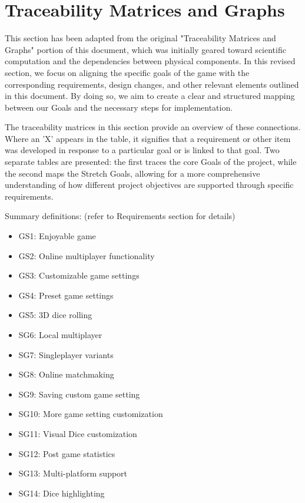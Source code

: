 \section{Traceability Matrices and Graphs}

This section has been adapted from the original "Traceability Matrices and Graphs" portion of this document, which was initially geared toward scientific computation and the dependencies between physical components. In this revised section, we focus on aligning the specific goals of the game with the corresponding requirements, design changes, and other relevant elements outlined in this document. By doing so, we aim to create a clear and structured mapping between our Goals and the necessary steps for implementation.

The traceability matrices in this section provide an overview of these connections. Where an 'X' appears in the table, it signifies that a requirement or other item was developed in response to a particular goal or is linked to that goal. Two separate tables are presented: the first traces the core Goals of the project, while the second maps the Stretch Goals, allowing for a more comprehensive understanding of how different project objectives are supported through specific requirements.

Summary definitions: (refer to Requirements section for details)
\begin{itemize}
	\item GS1: Enjoyable game
	\item GS2: Online multiplayer functionality
	\item GS3: Customizable game settings
	\item GS4: Preset game settings
	\item GS5: 3D dice rolling

	\item SG6: Local multiplayer
	\item SG7: Singleplayer variants
	\item SG8: Online matchmaking
	\item SG9: Saving custom game setting
	\item SG10: More game setting customization
	\item SG11: Visual Dice customization
	\item SG12: Post game statistics
	\item SG13: Multi-platform support
	\item SG14: Dice highlighting
\end{itemize}

